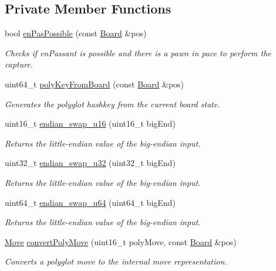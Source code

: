 \subsection*{Private Member Functions}
\begin{DoxyCompactItemize}
\item 
bool \mbox{\hyperlink{classPolyBook_a41fe4efcd8f8711183a1fe09753659c7}{en\+Pas\+Possible}} (const \mbox{\hyperlink{classBoard}{Board}} \&pos)
\begin{DoxyCompactList}\small\item\em Checks if en\+Passant is possible and there is a pawn in pace to perform the capture. \end{DoxyCompactList}\item 
uint64\+\_\+t \mbox{\hyperlink{classPolyBook_a787f1b994ee7f1fd68c482c2de32e568}{poly\+Key\+From\+Board}} (const \mbox{\hyperlink{classBoard}{Board}} \&pos)
\begin{DoxyCompactList}\small\item\em Generates the polyglot hashkey from the current board state. \end{DoxyCompactList}\item 
uint16\+\_\+t \mbox{\hyperlink{classPolyBook_a8b9892943292728371f789a813a27e08}{endian\+\_\+swap\+\_\+u16}} (uint16\+\_\+t big\+End)
\begin{DoxyCompactList}\small\item\em Returns the little-\/endian value of the big-\/endian input. \end{DoxyCompactList}\item 
uint32\+\_\+t \mbox{\hyperlink{classPolyBook_afa6d55231591c049ca1944a68b41fe2e}{endian\+\_\+swap\+\_\+u32}} (uint32\+\_\+t big\+End)
\begin{DoxyCompactList}\small\item\em Returns the little-\/endian value of the big-\/endian input. \end{DoxyCompactList}\item 
uint64\+\_\+t \mbox{\hyperlink{classPolyBook_acb13b8524d6af4dd768072404dcd8488}{endian\+\_\+swap\+\_\+u64}} (uint64\+\_\+t big\+End)
\begin{DoxyCompactList}\small\item\em Returns the little-\/endian value of the big-\/endian input. \end{DoxyCompactList}\item 
\mbox{\hyperlink{classMove}{Move}} \mbox{\hyperlink{classPolyBook_acf3e5a4d7722aa0784e5bda2d117c0c7}{convert\+Poly\+Move}} (uint16\+\_\+t poly\+Move, const \mbox{\hyperlink{classBoard}{Board}} \&pos)
\begin{DoxyCompactList}\small\item\em Converts a polyglot move to the internal move representation. \end{DoxyCompactList}\end{DoxyCompactItemize}
